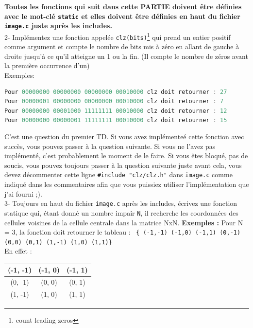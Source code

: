\documentclass[a4paper]{article}
\begin{document}
	\textbf{Toutes les fonctions qui suit dans cette PARTIE doivent être définies avec le mot-clé \texttt{static} et elles doivent être définies en haut du fichier \texttt{image.c} juste après les includes.} \\
	2- Implémentez une fonction appelée \texttt{clz(bits)}\footnote{count leading zeros} qui prend un entier positif comme argument et compte le nombre de bits mis à zéro en allant de gauche à droite jusqu'à ce qu'il atteigne un 1 ou la fin. (Il compte le nombre de zéros avant la première occurrence d'un) \\
	Exemples:
	\begin{lstlisting}[language=C]
Pour 00000000 00000000 00000000 00010000 clz doit retourner : 27
Pour 00000001 00000000 00000000 00010000 clz doit retourner : 7
Pour 00000000 00001000 11111111 00010000 clz doit retourner : 12
Pour 00000000 00000001 11111111 00010000 clz doit retourner : 15
	\end{lstlisting}
 	C'est une question du premier TD. Si vous avez implémenteé cette fonction avec succès, vous pouvez passer à la question suivante. Si vous ne l'avez pas implémenté, c'est probablement le moment de le faire. Si vous êtes bloqué, pas de soucis, vous pouvez toujours passer à la question suivante juste avant cela, vous devez décommenter cette ligne \texttt{\#include "clz/clz.h"} dans \texttt{image.c} comme indiqué dans les commentaires afin que vous puissiez utiliser l'implémentation que j'ai fourni ;). \\
	
	3- Toujours en haut du fichier \texttt{image.c} après les includes, écrivez une fonction statique qui, étant donné un nombre impair \texttt{N}, il recherche les coordonnées des cellules voisines de la cellule centrale dans la matrice NxN.
	\textbf{Exemples :}
	Pour N = 3, la fonction doit retourner le tableau : \texttt{ \{ (-1,-1) (-1,0) (-1,1) (0,-1) (0,0) (0,1) (1,-1) (1,0) (1,1)\} } \\
	En effet : 
	\begin{center}
		\begin{tabular}{ | c | c | c | } 
			\hline
			(-1, -1) & (-1, 0) & (-1, 1) \\
			\hline
			(0, -1) & (0, 0) & (0, 1) \\
			\hline
			(1, -1) & (1, 0) & (1, 1) \\
			\hline
		\end{tabular}
	\end{center}
	
\end{document}

